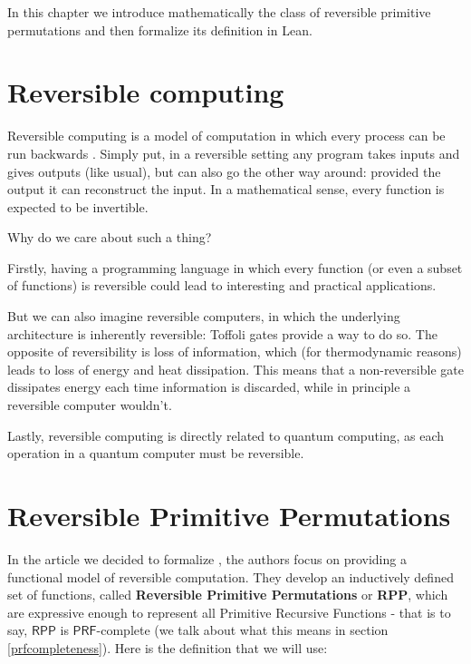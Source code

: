 \documentclass{book}
\theoremstyle{definition}
\theoremstyle{remark}
\theoremstyle{plain}
\newcommand{\RPP}{\mathsf{RPP}}
\newcommand{\PRF}{\mathsf{PRF}}
\begin{document}
In this chapter we introduce mathematically the class of reversible primitive permutations
and then formalize its definition in Lean.

\section{Reversible computing}

Reversible computing is a model of computation in which every process can be run backwards \cite{Morita17}\cite{perumalla2013chc}.
Simply put, in a reversible setting any program takes inputs and gives outputs (like usual), but can also go the other way around:
provided the output it can reconstruct the input.
In a mathematical sense, every function is expected to be invertible.

Why do we care about such a thing?

Firstly, having a programming language in which every function (or even a subset of functions) is reversible could lead to interesting and practical applications.

But we can also imagine reversible computers, in which the underlying architecture is inherently reversible:
Toffoli gates provide a way to do so.
The opposite of reversibility is loss of information, which (for thermodynamic reasons) leads to loss of energy and heat dissipation.
This means that a non-reversible gate dissipates energy each time information is discarded, while in principle a reversible computer wouldn't.

Lastly, reversible computing is directly related to quantum computing, as each operation in a quantum computer must be reversible.


\section{Reversible Primitive Permutations}

In the article we decided to formalize \cite{PAOLINI2020218}, the authors focus on providing a functional model of reversible computation.
They develop an inductively defined set of functions, called \textbf{Reversible Primitive Permutations} or \textbf{RPP},
which are expressive enough to represent all Primitive Recursive Functions -
that is to say, $\RPP$ is $\PRF$-complete (we talk about what this means in section \ref{prfcompleteness}).
Here is the definition that we will use:

\newpage
\end{document}
